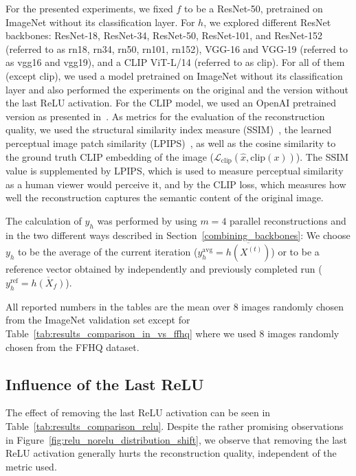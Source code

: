 \documentclass[10pt,twocolumn]{article}
\begin{document}
For the presented experiments, we fixed $f$ to be a ResNet-50, pretrained on ImageNet without its classification layer.
For $h$, we explored different ResNet backbones: ResNet-18, ResNet-34, ResNet-50, ResNet-101, and ResNet-152 (referred to as rn18, rn34, rn50, rn101, rn152), VGG-16 and VGG-19 (referred to as vgg16 and vgg19), and a CLIP ViT-L/14 (referred to as clip).
For all of them (except clip), we used a model pretrained on ImageNet without its classification layer and also performed the experiments on the original and the version without the last ReLU activation.
For the CLIP model, we used an OpenAI pretrained version as presented in~\cite{radfordLearningTransferableVisual2021}.
As metrics for the evaluation of the reconstruction quality, we used the structural similarity index measure (SSIM)~\cite{zhouwangImageQualityAssessment2004}, the learned perceptual image patch similarity (LPIPS)~\cite{zhangUnreasonableEffectivenessDeep2018}, as well as the cosine similarity to the ground truth CLIP embedding of the image ($\mathcal{L}_{\text{clip}}(\hat x, \text{clip}(x))$).
The SSIM value is supplemented by LPIPS, which is used to measure perceptual similarity as a human viewer would perceive it, and by the CLIP loss, which measures how well the reconstruction captures the semantic content of the original image.

The calculation of $y_h$ was performed by using $m=4$ parallel reconstructions and in the two different ways described in Section~\ref{combining_backbones}:
We choose $y_h$ to be the average of the current iteration ($y_h^\text{avg}=\overline{h(X^{(t)})}$) or to be a reference vector obtained by independently and previously completed run ($y_h^\text{ref}=\overline{h(X_f)}$).

All reported numbers in the tables are the mean over 8 images randomly chosen from the ImageNet validation set except for Table~\ref{tab:results_comparison_in_vs_ffhq} where we used 8 images randomly chosen from the FFHQ dataset\cite{karras2019style}.

\subsection{Influence of the Last ReLU}
The effect of removing the last ReLU activation can be seen in Table~\ref{tab:results_comparison_relu}.
Despite the rather promising observations in Figure~\ref{fig:relu_norelu_distribution_shift}, we observe that removing the last ReLU activation generally hurts the reconstruction quality, independent of the metric used.
\end{document}
